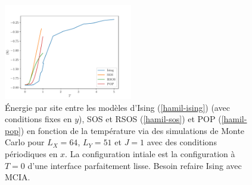 \begin{figure}
    \centering
    \includegraphics[width=0.5\textwidth]{isingtosos/comparaison-modeles.pdf}
    \caption{Énergie par site entre les modèles d'Ising (\ref{hamil-ising}) (avec conditions fixes en $y$), SOS et RSOS (\ref{hamil-sos}) et POP (\ref{hamil-pop}) en fonction de la température via des simulations de Monte Carlo pour $L_X=64$, $L_Y=51$ et $J=1$ avec des conditions périodiques en $x$. La configuration intiale est la configuration à $T=0$ d'une interface parfaitement lisse. {\color{red} Besoin refaire Ising avec MCIA.} }
    \label{comparaison-modeles}
\end{figure}